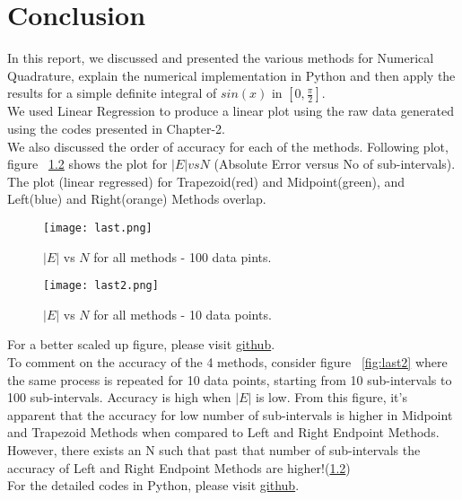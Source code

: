 \documentclass[a4paper, 12pt]{report}
\begin{document}
    
\chapter{Conclusion}
In this report, we discussed and presented the various methods for Numerical Quadrature, explain the numerical implementation in Python and then apply the results for a simple definite integral of $sin(x)$ in $[0,\frac{\pi}{2}]$.\\ We used Linear Regression to produce a linear plot using the raw data generated using the codes presented in Chapter-2.\\
We also discussed the order of accuracy for each of the methods. Following plot, figure ~\ref{fig:last} shows the plot for $|E| vs N$ (Absolute Error versus No of sub-intervals). The plot (linear regressed) for Trapezoid(red) and Midpoint(green), and Left(blue) and Right(orange) Methods overlap. 

\begin{figure}[h]
    \centering
    \texttt{[image: last.png]}
    \caption{$|E|$ vs $N$ for all methods - 100 data pints.}
    \label{fig:last}
    \end{figure}

 \begin{figure}[h]
    \centering
    \texttt{[image: last2.png]}
    \caption{$|E|$ vs $N$ for all methods - 10 data points.}
    \label{fig:last}
    \end{figure}

For a better scaled up figure, please visit \href{https://github.com/YashIITM/Numerical-Quadrature}{github}.\\
To comment on the accuracy of the 4 methods, consider figure ~\ref{fig:last2} where the same process is repeated for 10 data points, starting from 10 sub-intervals to 100 sub-intervals.
Accuracy is high when $|E|$ is low. From this figure, it's apparent that the accuracy for low number of sub-intervals is higher in Midpoint and Trapezoid Methods when compared to Left and Right Endpoint Methods. However, there exists an N such that past that number of sub-intervals
the accuracy of Left and Right Endpoint Methods are higher!(\ref{fig:last})\\
For the detailed codes in Python, please visit \href{https://github.com/YashIITM/Numerical-Quadrature}{github}.
    \printbibliography

    \appendix

  
\end{document}
